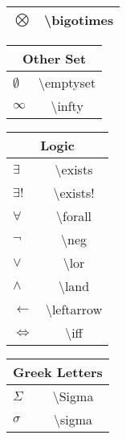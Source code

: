 \begin{multicols}{2}
\begin{tabular}{|l|c|}
		$\bigotimes$ & \textbackslash{}bigotimes \\
			\hline
	\end{tabular}
	\begin{tabular}{|l|c|}
			\hline
		\multicolumn{2}{|c|}{Other Set} \\
			\hline
		$\emptyset$ & \textbackslash{}emptyset \\
		$\infty$ & \textbackslash{}infty \\
			\hline
	\end{tabular}
	\begin{tabular}{|l|c|}
			\hline
		\multicolumn{2}{|c|}{Logic} \\
			\hline
		$\exists$ & \textbackslash{}exists \\
		$\exists!$ & \textbackslash{}exists! \\
		$\forall$ & \textbackslash{}forall \\
		$\neg$ & \textbackslash{}neg \\
		$\lor$ & \textbackslash{}lor \\
		$\land$ & \textbackslash{}land \\
		$\leftarrow$ & \textbackslash{}leftarrow \\
		$\iff$ & \textbackslash{}iff \\
			\hline
	\end{tabular}
	\begin{tabular}{|l|c|}
			\hline
		\multicolumn{2}{|c|}{Greek Letters} \\
			\hline
		$\Sigma$ & \textbackslash{}Sigma \\
		$\sigma$ & \textbackslash{}sigma \\
			\hline
	\end{tabular}
\end{multicols}

